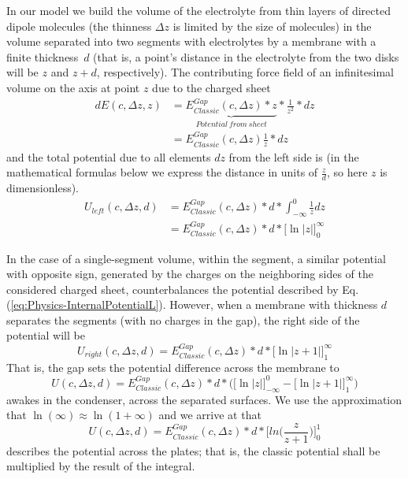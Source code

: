 In our model we build the volume of the electrolyte
from thin layers of directed dipole molecules (the thinness $\Delta z$ is limited by the size of molecules) in the volume separated into two segments with electrolytes by a membrane with
a finite thickness~$d$ (that is, a point's distance in the electrolyte from the 
two disks will be $z$ and $z+d$, respectively). 
The contributing force field of an infinitesimal volume on the axis at point $z$ due to the charged sheet 
\begin{align}
dE(c,\Delta z,z) &= 
\underbrace{E^{Gap}_{Classic}(c,\Delta z)*z}_{Potential~ from~sheet}*\frac{1}{z^2}*dz\\
&=  
E^{Gap}_{Classic}(c,\Delta z)\frac{1}{z}*dz
\end{align}
and the total potential due to all elements $dz$ from the left side is (in the mathematical formulas below we express the distance in units of $\frac{z}{d}$, so here $z$ is dimensionless).
\begin{align}
	U_{left}(c,\Delta z,d)&=E^{Gap}_{Classic}(c,\Delta z)*d*\int_{-\infty}^0\frac{1}{z} dz\\ 
	&= E^{Gap}_{Classic}(c,\Delta z)*d *\biggl[\ln | z | \biggr]_{0}^{\infty}\label{eq:Physics-InternalPotentialL}
\end{align}


In the case of a single-segment volume, within the segment, a similar potential with opposite sign, generated by the charges on the neighboring sides of the considered charged sheet,
counterbalances the potential described by Eq.(\ref{eq:Physics-InternalPotentialL}). However, when a membrane with thickness $d$ separates the segments (with no charges in the gap), the right side of the potential will be
\begin{equation}
	U_{right}(c,\Delta z,d)
	= E^{Gap}_{Classic}(c,\Delta z) * d *\biggl[\ln | z+1 | \biggr]_{1}^{\infty}\label{eq:Physics-InternalPotentialR}
\end{equation}
\noindent
That is, the gap sets the potential difference across the membrane to
\begin{equation}
	U(c,\Delta z,d)=
	E^{Gap}_{Classic}(c,\Delta z) *d *\biggl(\biggl[\ln | z | \biggr]_{-\infty}^{0}-\biggl[\ln | z+1 | \biggr]_{1}^{\infty}\biggr)\label{eq:Physics-InternalPotentialFunction}
\end{equation}
awakes in the condenser, across the separated surfaces.
%
We use the approximation that $\ln(\infty)\approx \ln(1+\infty)$
and we arrive at that
\begin{equation}
	U(c,\Delta z,d)=E^{Gap}_{Classic}(c,\Delta z)*d*\biggl[ln\biggl(\frac{z}{z+1}\biggr)\biggr]_{0}^{1}\label{eq:Physics-Internal1 }
\end{equation}
\noindent describes the potential across the plates; that is,
the classic potential shall be multiplied by the result of the integral.

